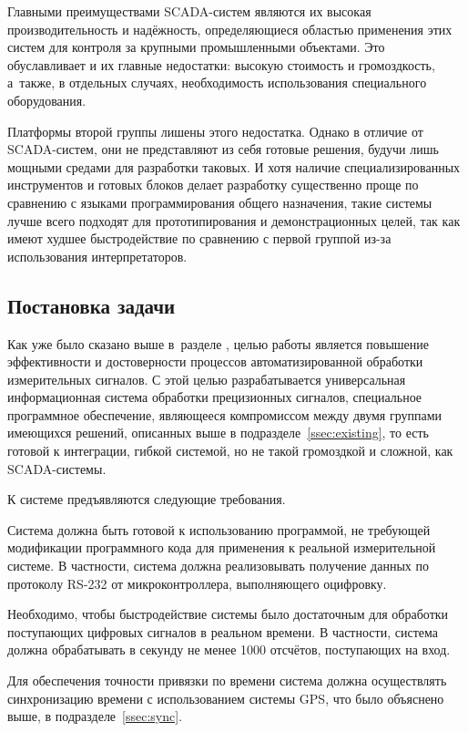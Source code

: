 \documentclass[a4paper, 14pt]{extarticle}
\begin{document}
  Главными преимуществами SCADA-систем являются их высокая производительность и надёжность,
  определяющиеся областью применения этих систем для контроля за крупными промышленными объектами.
  Это обуславливает и их главные недостатки: высокую стоимость и громоздкость, а~также, в отдельных
  случаях, необходимость использования специального оборудования.

  Платформы второй группы лишены этого недостатка. Однако в отличие от SCADA-систем, они не
  представляют из себя готовые решения, будучи лишь мощными средами для разработки таковых.
  И хотя наличие специализированных инструментов и готовых блоков делает разработку существенно
  проще по сравнению с языками программирования общего назначения, такие системы лучше всего
  подходят для прототипирования и демонстрационных целей, так как имеют худшее быстродействие по
  сравнению с первой группой из-за использования интерпретаторов.

  \subsection{Постановка задачи}\label{ssec:task}

  Как уже было сказано выше в~разделе ,
  целью работы является повышение эффективности и достоверности процессов автоматизированной
  обработки измерительных сигналов. С этой целью разрабатывается универсальная информационная
  система обработки прецизионных сигналов,
  специальное программное обеспечение,
  являющееся компромиссом между двумя группами имеющихся решений, описанных выше в
  подразделе~\ref{ssec:existing}, то есть готовой к интеграции, гибкой системой, но не такой
  громоздкой и сложной, как SCADA-системы.

  К системе предъявляются следующие требования.

  Система должна быть готовой к использованию программой, не требующей модификации программного кода
  для применения к реальной измерительной системе. В частности, система должна реализовывать
  получение данных по протоколу RS-232\cite{sweet-serial} от микроконтроллера, выполняющего оцифровку.

  Необходимо, чтобы быстродействие системы было достаточным для обработки поступающих цифровых
  сигналов в реальном времени. В частности, система должна обрабатывать в секунду не менее 1000
  отсчётов, поступающих на вход.

  Для обеспечения точности привязки по времени система должна осуществлять синхронизацию времени с
  использованием системы GPS, что было объяснено выше, в подразделе~\ref{ssec:sync}.
\end{document}
